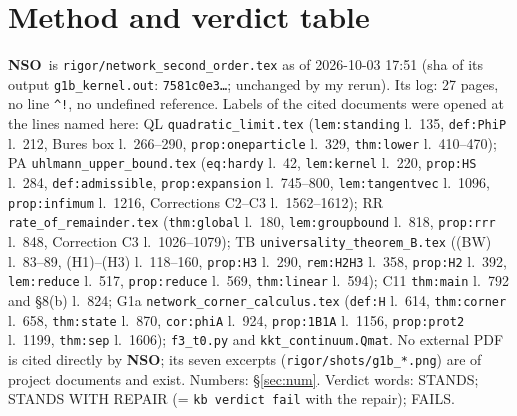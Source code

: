 \documentclass[11pt]{article}
\newcommand{\doc}{\textbf{NSO}}
\begin{document}
\section{Method and verdict table}\label{sec:method}
\doc\ is \texttt{rigor/network\_second\_order.tex} as of 2026-10-03 17:51 (sha of its output
\texttt{g1b\_kernel.out}: \texttt{7581c0e3\dots}; unchanged by my rerun).  Its log: 27 pages, no line \verb|^!|, no
undefined reference.  Labels of the cited documents were opened at the lines named here: QL
\texttt{quadratic\_limit.tex} (\texttt{lem:standing} l.~135, \texttt{def:PhiP} l.~212, Bures box l.~266--290,
\texttt{prop:oneparticle} l.~329, \texttt{thm:lower} l.~410--470); PA \texttt{uhlmann\_upper\_bound.tex}
(\texttt{eq:hardy} l.~42, \texttt{lem:kernel} l.~220, \texttt{prop:HS} l.~284, \texttt{def:admissible},
\texttt{prop:expansion} l.~745--800, \texttt{lem:tangentvec} l.~1096, \texttt{prop:infimum} l.~1216, Corrections
C2--C3 l.~1562--1612); RR \texttt{rate\_of\_remainder.tex} (\texttt{thm:global} l.~180, \texttt{lem:groupbound}
l.~818, \texttt{prop:rrr} l.~848, Correction C3 l.~1026--1079); TB \texttt{universality\_theorem\_B.tex} ((BW)
l.~83--89, (H1)--(H3) l.~118--160, \texttt{prop:H3} l.~290, \texttt{rem:H2H3} l.~358, \texttt{prop:H2} l.~392,
\texttt{lem:reduce} l.~517, \texttt{prop:reduce} l.~569, \texttt{thm:linear} l.~594); C11 \texttt{thm:main} l.~792 and
\S8(b) l.~824; G1a \texttt{network\_corner\_calculus.tex} (\texttt{def:H} l.~614, \texttt{thm:corner} l.~658,
\texttt{thm:state} l.~870, \texttt{cor:phiA} l.~924, \texttt{prop:1B1A} l.~1156, \texttt{prop:prot2} l.~1199,
\texttt{thm:sep} l.~1606); \texttt{f3\_t0.py} and \texttt{kkt\_continuum.Qmat}.  No external PDF is cited directly by
\doc; its seven excerpts (\texttt{rigor/shots/g1b\_*.png}) are of project documents and exist.
Numbers: \S\ref{sec:num}.  Verdict words: STANDS; STANDS WITH REPAIR (= \texttt{kb verdict fail} with the repair);
FAILS.
\end{document}
